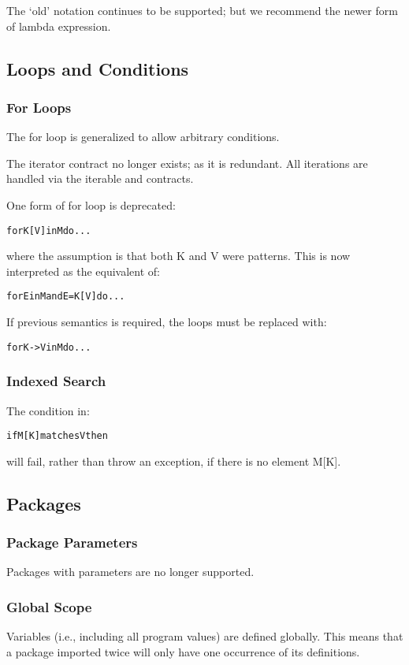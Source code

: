 The `old' notation continues to be supported; but we recommend the newer form of lambda expression.

\subsection{Loops and Conditions}

\subsubsection{For Loops}
The for loop is generalized to allow arbitrary conditions.

The iterator contract no longer exists; as it is redundant. All iterations are handled via the iterable and  contracts.

One form of for loop is deprecated:
\begin{alltt}
for K[V] in M do ...
\end{alltt}
where the assumption is that both K and V were patterns. This is now interpreted as the equivalent of:
\begin{alltt}
for E in M and E=K[V] do ...
\end{alltt}
If previous semantics is required, the loops must be replaced with:
\begin{alltt}
for K->V in M do ...
\end{alltt}

\subsubsection{Indexed Search}
The condition in:
\begin{alltt}
if M[K] matches V then 
\end{alltt}
will fail, rather than throw an exception, if there is no element M[K].

\subsection{Packages}

\subsubsection{Package Parameters}
Packages with parameters are no longer supported.

\subsubsection{Global Scope}
Variables (i.e., including all program values) are defined globally. This means that a package imported twice will only have one occurrence of its definitions.

